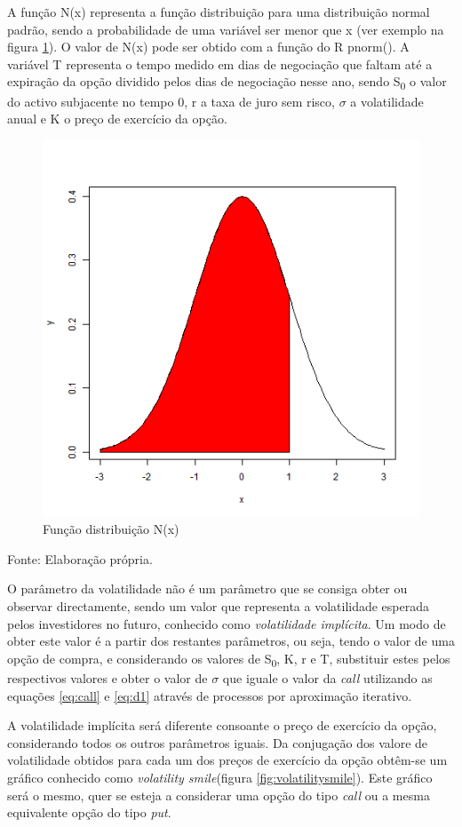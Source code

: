 \documentclass[
  12pt,
  a4paper,
  openany]{book}
\begin{document}
A função N(x) representa a função distribuição para uma distribuição normal padrão, sendo a probabilidade de uma variável ser menor que x (ver exemplo na figura \ref{fig:fdistribuicao}). O valor de N(x) pode ser obtido com a função do R pnorm(). A variável T representa o tempo medido em dias de negociação que faltam até a expiração da opção dividido pelos dias de negociação nesse ano, sendo S\textsubscript{0} o valor do activo subjacente no tempo 0, r a taxa de juro sem risco, \(\sigma\) a volatilidade anual e K o preço de exercício da opção.

\begin{figure}

{\centering \includegraphics[width=0.45\linewidth]{image/fdistribuicao} 

}

\caption{Função distribuição N(x)}\label{fig:fdistribuicao}
\end{figure}
\FloatBarrier
\centering

Fonte: Elaboração própria.

\justifying
\bigskip

O parâmetro da volatilidade não é um parâmetro que se consiga obter ou observar directamente, sendo um valor que representa a volatilidade esperada pelos investidores no futuro, conhecido como \emph{volatilidade implícita}. Um modo de obter este valor é a partir dos restantes parâmetros, ou seja, tendo o valor de uma opção de compra, e considerando os valores de S\textsubscript{0}, K, r e T, substituir estes pelos respectivos valores e obter o valor de \(\sigma\) que iguale o valor da \emph{call} utilizando as equações \eqref{eq:call} e \eqref{eq:d1} através de processos por aproximação iterativo.

A volatilidade implícita será diferente consoante o preço de exercício da opção, considerando todos os outros parâmetros iguais. Da conjugação dos valore de volatilidade obtidos para cada um dos preços de exercício da opção obtêm-se um gráfico conhecido como \emph{volatility smile}(figura \ref{fig:volatilitysmile}). Este gráfico será o mesmo, quer se esteja a considerar uma opção do tipo \emph{call} ou a mesma equivalente opção do tipo \emph{put}.
\end{document}
